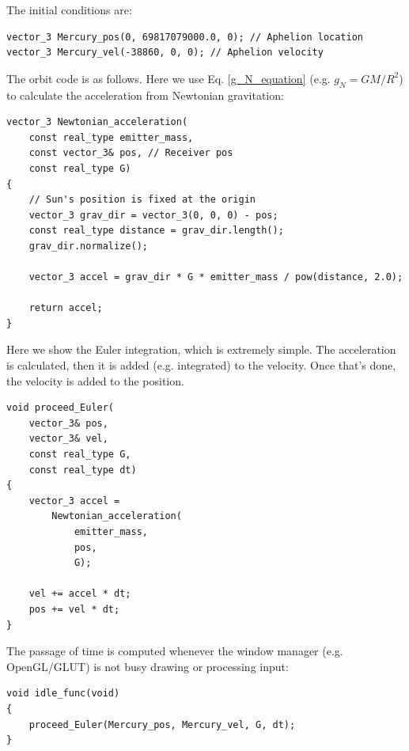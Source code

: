 \documentclass[12pt]{article}
\begin{document}
The initial conditions are:
\begin{lstlisting}
vector_3 Mercury_pos(0, 69817079000.0, 0); // Aphelion location
vector_3 Mercury_vel(-38860, 0, 0); // Aphelion velocity
\end{lstlisting}

The orbit code is as follows. 
Here we use Eq. \ref{g_N_equation} (e.g. $g_N = {G M}/{R^2}$) to calculate the acceleration from Newtonian gravitation:
\begin{lstlisting}
vector_3 Newtonian_acceleration(
	const real_type emitter_mass,
	const vector_3& pos, // Receiver pos
	const real_type G)
{
	// Sun's position is fixed at the origin
	vector_3 grav_dir = vector_3(0, 0, 0) - pos;
	const real_type distance = grav_dir.length();
	grav_dir.normalize();

	vector_3 accel = grav_dir * G * emitter_mass / pow(distance, 2.0);

	return accel;
}
\end{lstlisting}

Here we show the Euler integration, which is extremely simple.
The acceleration is calculated, then it is added (e.g. integrated) to the velocity.
Once that's done, the velocity is added to the position.
\begin{lstlisting}
void proceed_Euler(
	vector_3& pos, 
	vector_3& vel, 
	const real_type G, 
	const real_type dt)
{
	vector_3 accel = 
		Newtonian_acceleration(
			emitter_mass, 
			pos, 
			G);

	vel += accel * dt;
	pos += vel * dt;
}

\end{lstlisting}

The passage of time is computed whenever the window manager (e.g. OpenGL/GLUT) is not busy drawing or processing input:
\begin{lstlisting}
void idle_func(void)
{
	proceed_Euler(Mercury_pos, Mercury_vel, G, dt);
}
\end{lstlisting}
\end{document}
